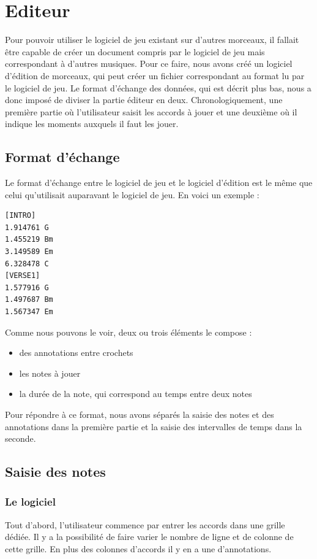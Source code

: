 \chapter{Editeur}

Pour pouvoir utiliser le logiciel de jeu existant sur d'autres morceaux, il fallait être capable de créer un document compris par le logiciel de jeu mais correspondant à d'autres musiques. Pour ce faire, nous avons créé un logiciel d'édition de morceaux, qui peut créer un fichier correspondant au format lu par le logiciel de jeu. Le format d'échange des données, qui est décrit plus bas, nous a donc imposé de diviser la partie éditeur en deux. Chronologiquement, une première partie où l'utilisateur saisit les accords à jouer et une deuxième où il indique les moments auxquels il faut les jouer.

\section{Format d'échange}

Le format d'échange entre le logiciel de jeu et le logiciel d'édition est le même que celui qu'utilisait auparavant le logiciel de jeu.
En voici un exemple :
\begin{verbatim}
[INTRO]
1.914761 G
1.455219 Bm
3.149589 Em
6.328478 C
[VERSE1]
1.577916 G
1.497687 Bm
1.567347 Em
\end{verbatim}
Comme nous pouvons le voir, deux ou trois éléments le compose :
\begin{itemize}
\item des annotations entre crochets
\item les notes à jouer
\item la durée de la note, qui correspond au temps entre deux notes
\end{itemize}
Pour répondre à ce format, nous avons séparés la saisie des notes et des annotations dans la première partie et la saisie des intervalles de temps dans la seconde.

\section{Saisie des notes}

\subsection{Le logiciel}

Tout d'abord, l'utilisateur commence par entrer les accords dans une grille dédiée. Il y a la possibilité de faire varier le nombre de ligne et de colonne de cette grille. En plus des colonnes d’accords il y en a une d’annotations.

